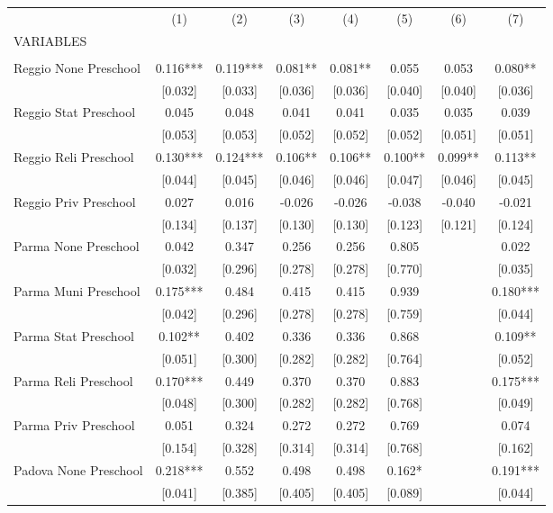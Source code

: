 \begin{tabular}{lccccccc} \hline
 & (1) & (2) & (3) & (4) & (5) & (6) & (7) \\
VARIABLES &  &  &  &  &  &  &  \\ \hline
 &  &  &  &  &  &  &  \\
Reggio None Preschool & 0.116*** & 0.119*** & 0.081** & 0.081** & 0.055 & 0.053 & 0.080** \\
 & [0.032] & [0.033] & [0.036] & [0.036] & [0.040] & [0.040] & [0.036] \\
Reggio Stat Preschool & 0.045 & 0.048 & 0.041 & 0.041 & 0.035 & 0.035 & 0.039 \\
 & [0.053] & [0.053] & [0.052] & [0.052] & [0.052] & [0.051] & [0.051] \\
Reggio Reli Preschool & 0.130*** & 0.124*** & 0.106** & 0.106** & 0.100** & 0.099** & 0.113** \\
 & [0.044] & [0.045] & [0.046] & [0.046] & [0.047] & [0.046] & [0.045] \\
Reggio Priv Preschool & 0.027 & 0.016 & -0.026 & -0.026 & -0.038 & -0.040 & -0.021 \\
 & [0.134] & [0.137] & [0.130] & [0.130] & [0.123] & [0.121] & [0.124] \\
Parma None Preschool & 0.042 & 0.347 & 0.256 & 0.256 & 0.805 &  & 0.022 \\
 & [0.032] & [0.296] & [0.278] & [0.278] & [0.770] &  & [0.035] \\
Parma Muni Preschool & 0.175*** & 0.484 & 0.415 & 0.415 & 0.939 &  & 0.180*** \\
 & [0.042] & [0.296] & [0.278] & [0.278] & [0.759] &  & [0.044] \\
Parma Stat Preschool & 0.102** & 0.402 & 0.336 & 0.336 & 0.868 &  & 0.109** \\
 & [0.051] & [0.300] & [0.282] & [0.282] & [0.764] &  & [0.052] \\
Parma Reli Preschool & 0.170*** & 0.449 & 0.370 & 0.370 & 0.883 &  & 0.175*** \\
 & [0.048] & [0.300] & [0.282] & [0.282] & [0.768] &  & [0.049] \\
Parma Priv Preschool & 0.051 & 0.324 & 0.272 & 0.272 & 0.769 &  & 0.074 \\
 & [0.154] & [0.328] & [0.314] & [0.314] & [0.768] &  & [0.162] \\
Padova None Preschool & 0.218*** & 0.552 & 0.498 & 0.498 & 0.162* &  & 0.191*** \\
 & [0.041] & [0.385] & [0.405] & [0.405] & [0.089] &  & [0.044] \\

\end{tabular}
